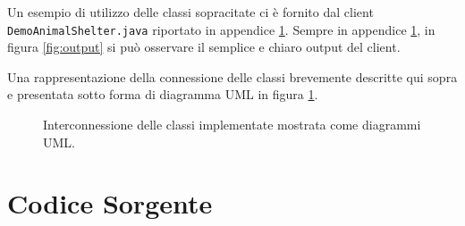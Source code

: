 \documentclass[a4paper,11pt]{article}
\begin{document}
Un esempio di utilizzo delle classi sopracitate ci è fornito dal client {\tt DemoAnimalShelter.java} riportato in appendice \ref{appendice:A}. Sempre in appendice \ref{appendice:A}, in figura \ref{fig:output} si può osservare il semplice e chiaro output del client.

Una rappresentazione della connessione delle classi brevemente descritte qui sopra e presentata sotto forma di diagramma UML in figura \ref{fig:UML}.

\begin{figure}[!t]
  \caption{\small Interconnessione delle classi implementate mostrata come diagrammi UML.}
  \label{fig:UML}
\end{figure}


\newpage
\printbibliography


\newpage
\appendix
\section{Codice Sorgente}
\label{appendice:A}
\end{document}
